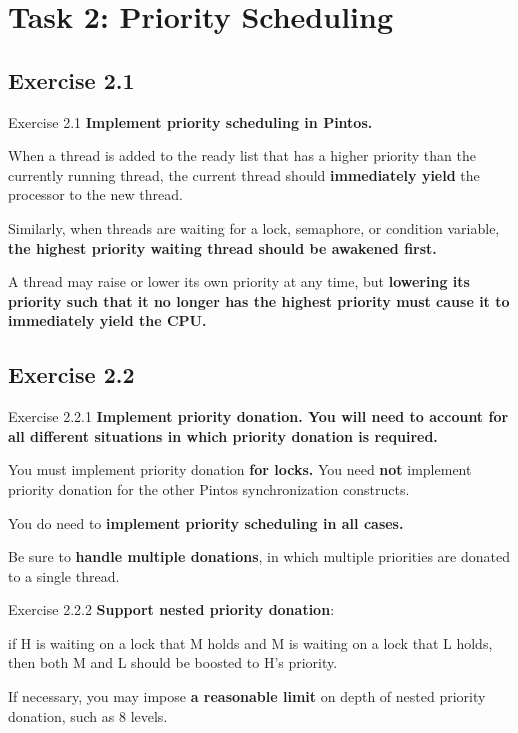 \documentclass{beamer}
\begin{document}
\section{Task 2: Priority Scheduling}
\subsection{Exercise 2.1}
\begin{frame}[fragile]{Exercise 2.1}
\textbf{Implement priority scheduling in Pintos.}

When a thread is added to the ready list that has a higher priority than the currently running thread, the current thread should \textbf{immediately yield} the processor to the new thread.

Similarly, when threads are waiting for a lock, semaphore, or condition variable, \textbf{the highest priority waiting thread should be awakened first.}

A thread may raise or lower its own priority at any time, but \textbf{lowering its priority such that it no longer has the highest priority must cause it to immediately yield the CPU.}
\end{frame}
\subsection{Exercise 2.2}
\begin{frame}[fragile]{Exercise 2.2.1}
    \textbf{Implement priority donation.
You will need to account for all different situations in which priority donation is required.}

You must implement priority donation \textbf{for locks.} You need \textbf{not} implement priority donation for the other Pintos synchronization constructs.

You do need to \textbf{implement priority scheduling in all cases.}

Be sure to \textbf{handle multiple donations}, in which multiple priorities are donated to a single thread.
\end{frame}

\begin{frame}[fragile]{Exercise 2.2.2}
    \textbf{Support nested priority donation}:

if H is waiting on a lock that M holds and M is waiting on a lock that L holds, then both M and L should be boosted to H's priority.

If necessary, you may impose \textbf{a reasonable limit} on depth of nested priority donation, such as 8 levels.
\end{frame}
\end{document}
